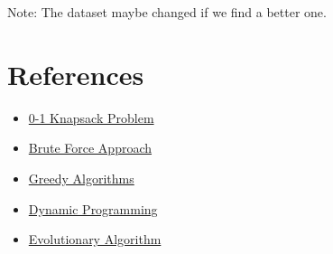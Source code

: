 \documentclass{article}
\begin{document}
Note: The dataset maybe changed if we find a better one.

\section*{References}
\begin{itemize}
    \item \href{https://www.geeksforgeeks.org/0-1-knapsack-problem-dp-10/}{0-1 Knapsack Problem}
    \item \href{https://www.geeksforgeeks.org/brute-force-approach-and-its-pros-and-cons/}{Brute Force Approach}
    \item \href{https://www.geeksforgeeks.org/greedy-algorithms/}{Greedy Algorithms}
    \item \href{https://www.geeksforgeeks.org/dynamic-programming/}{Dynamic Programming}
    \item \href{https://www.sciencedirect.com/topics/mathematics/evolutionary-algorithm/}{Evolutionary Algorithm}
\end{itemize}
\end{document}
